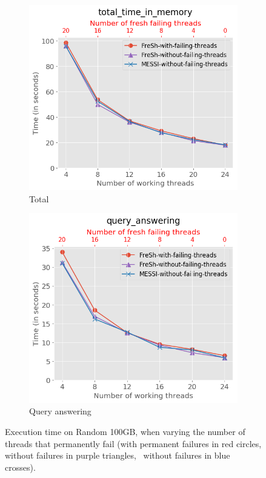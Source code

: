 \begin{figure}[htbp]
    \centering
    \begin{subfigure}{0.48\textwidth}  
        \includegraphics[width=\textwidth]{figures/Experiments/variable-num-failures-total}
        \caption{Total}
        \label{fig:eval:variable-num-failures:total}
    \end{subfigure}    
    \hfill
    \begin{subfigure}{0.48\textwidth}  
        \includegraphics[width=\textwidth]{figures/Experiments/variable-num-failures-query}
        \caption{Query answering}
        \label{fig:eval:variable-num-failures:queries}
    \end{subfigure}    
    \caption{Execution time on Random 100GB, when varying the number of threads that permanently fail 
    (\Fresh with permanent failures in red circles, \Fresh without failures in purple triangles, \MESSI\ without failures in blue crosses).}
    \label{fig:eval:variable-num-failures}
\end{figure}

